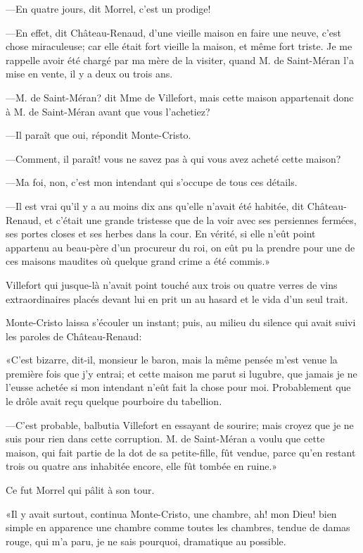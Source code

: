 —En quatre jours, dit Morrel, c'est un prodige! 

—En effet, dit Château-Renaud, d'une vieille maison en faire une neuve, c'est chose miraculeuse; car elle était fort vieille la maison, et même fort triste. Je me rappelle avoir été chargé par ma mère de la visiter, quand M. de Saint-Méran l'a mise en vente, il y a deux ou trois ans. 

—M. de Saint-Méran? dit Mme de Villefort, mais cette maison appartenait donc à M. de Saint-Méran avant que vous l'achetiez? 

—Il paraît que oui, répondit Monte-Cristo. 

—Comment, il paraît! vous ne savez pas à qui vous avez acheté cette maison?  

—Ma foi, non, c'est mon intendant qui s'occupe de tous ces détails. 

—Il est vrai qu'il y a au moins dix ans qu'elle n'avait été habitée, dit Château-Renaud, et c'était une grande tristesse que de la voir avec ses persiennes fermées, ses portes closes et ses herbes dans la cour. En vérité, si elle n'eût point appartenu au beau-père d'un procureur du roi, on eût pu la prendre pour une de ces maisons maudites où quelque grand crime a été commis.» 

Villefort qui jusque-là n'avait point touché aux trois ou quatre verres de vins extraordinaires placés devant lui en prit un au hasard et le vida d'un seul trait. 

Monte-Cristo laissa s'écouler un instant; puis, au milieu du silence qui avait suivi les paroles de Château-Renaud: 

«C'est bizarre, dit-il, monsieur le baron, mais la même pensée m'est venue la première fois que j'y entrai; et cette maison me parut si lugubre, que jamais je ne l'eusse achetée si mon intendant n'eût fait la chose pour moi. Probablement que le drôle avait reçu quelque pourboire du tabellion. 

—C'est probable, balbutia Villefort en essayant de sourire; mais croyez que je ne suis pour rien dans cette corruption. M. de Saint-Méran a voulu que cette maison, qui fait partie de la dot de sa petite-fille, fût vendue, parce qu'en restant trois ou quatre ans inhabitée encore, elle fût tombée en ruine.» 

Ce fut Morrel qui pâlit à son tour.  

«Il y avait surtout, continua Monte-Cristo, une chambre, ah! mon Dieu! bien simple en apparence une chambre comme toutes les chambres, tendue de damas rouge, qui m'a paru, je ne sais pourquoi, dramatique au possible. 

